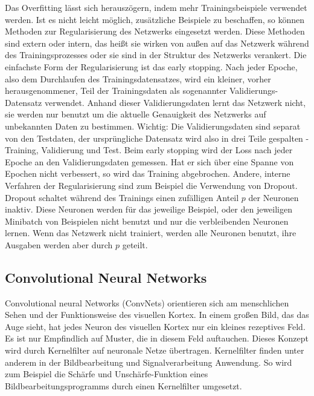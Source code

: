 Das Overfitting lässt sich herauszögern, indem mehr Trainingsbeispiele verwendet werden.
Ist es nicht leicht möglich, zusätzliche Beispiele zu beschaffen, so können Methoden zur Regularisierung des Netzwerks eingesetzt werden.
Diese Methoden sind extern oder intern, das heißt sie wirken von außen auf das Netzwerk während des Trainingsprozesses oder sie sind in der Struktur des Netzwerks verankert.
Die einfachste Form der Regularisierung ist das early stopping.
Nach jeder Epoche, also dem Durchlaufen des Trainingsdatensatzes, wird ein kleiner, vorher herausgenommener, Teil der Trainingsdaten als sogenannter Validierungs-Datensatz verwendet.
Anhand dieser Validierungsdaten lernt das Netzwerk nicht, sie werden nur benutzt um die aktuelle Genauigkeit des Netzwerks auf unbekannten Daten zu bestimmen.
Wichtig: Die Validierungsdaten sind separat von den Testdaten, der ursprüngliche Datensatz wird also in drei Teile gespalten - Training, Validierung und Test.
Beim early stopping wird der Loss nach jeder Epoche an den Validierungsdaten gemessen.
Hat er sich über eine Spanne von Epochen nicht verbessert, so wird das Training abgebrochen.
Andere, interne Verfahren der Regularisierung sind zum Beispiel die Verwendung von Dropout.
Dropout schaltet während des Trainings einen zufälligen Anteil $p$ der Neuronen inaktiv.
Diese Neuronen werden für das jeweilige Beispiel, oder den jeweiligen Minibatch von Beispielen nicht benutzt und nur die verbleibenden Neuronen lernen.
Wenn das Netzwerk nicht trainiert, werden alle Neuronen benutzt, ihre Ausgaben werden aber durch $p$ geteilt.


\subsection{Convolutional Neural Networks}

Convolutional neural Networks (ConvNets) orientieren sich am menschlichen Sehen und der Funktionsweise des visuellen Kortex.
In einem großen Bild, das das Auge sieht, hat jedes Neuron des visuellen Kortex nur ein kleines rezeptives Feld.
Es ist nur Empfindlich auf Muster, die in diesem Feld auftauchen.
Dieses Konzept wird durch Kernelfilter auf neuronale Netze übertragen.
Kernelfilter finden unter anderem in der Bildbearbeitung und Signalverarbeitung Anwendung.
So wird zum Beispiel die Schärfe und Unschärfe-Funktion eines Bildbearbeitungsprogramms durch einen Kernelfilter umgesetzt.


